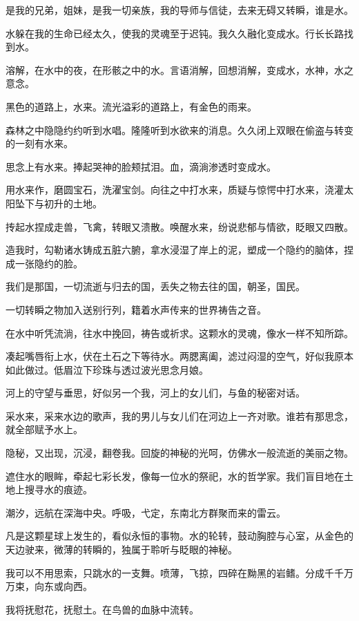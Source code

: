\documentclass[UTF8]{article}
\begin{document}
\par 是我的兄弟，姐妹，是我一切亲族，我的导师与信徒，去来无碍又转瞬，谁是水。
\par 水躲在我的生命已经太久，使我的灵魂至于迟钝。我久久融化变成水。行长长路找到水。
\par 溶解，在水中的夜，在形骸之中的水。言语消解，回想消解，变成水，水神，水之意念。
\\[0.6cm]
\par 黑色的道路上，水来。流光溢彩的道路上，有金色的雨来。
\par 森林之中隐隐约约听到水唱。隆隆听到水欲来的消息。久久闭上双眼在偷盗与转变的一刻有水来。
\par 思念上有水来。捧起哭神的脸颊拭泪。血，滴淌渗透时变成水。
\par 用水来作，磨圆宝石，洗濯宝剑。向往之中打水来，质疑与惊愕中打水来，浇灌太阳坠下与初升的土地。
\par 抟起水捏成走兽，飞禽，转眼又溃散。唤醒水来，纷说悲郁与情欲，眨眼又四散。
\par 造我时，勾勒诸水铸成五脏六腑，拿水浸湿了岸上的泥，塑成一个隐约的脑体，捏成一张隐约的脸。
\par 我们是那国，一切流逝与归去的国，丢失之物去往的国，朝圣，国民。
\par 一切转瞬之物加入送别行列，籍着水声传来的世界祷告之音。
\par 在水中听凭流淌，往水中挽回，祷告或祈求。这颗水的灵魂，像水一样不知所踪。
\par 凑起嘴唇衔上水，伏在土石之下等待水。两腮离阖，滤过闷湿的空气，好似我原本如此做过。低眉泣下珍珠与透过波光思念月娘。
\par 河上的守望与垂思，好似另一个我，河上的女儿们，与鱼的秘密对话。
\par 采水来，采来水边的歌声，我的男儿与女儿们在河边上一齐对歌。谁若有那思念，就全部赋予水上。
\par 隐秘，又出现，沉浸，翻卷我。回旋的神秘的光呵，仿佛水一般流逝的美丽之物。
\par 遮住水的眼眸，牵起七彩长发，像每一位水的祭祀，水的哲学家。我们盲目地在土地上搜寻水的痕迹。
\par 潮汐，远航在深海中央。呼吸，弋定，东南北方群聚而来的雷云。
\par 凡是这颗星球上发生的，看似永恒的事物。水的轮转，鼓动胸腔与心室，从金色的天边驶来，微薄的转瞬的，独属于聆听与眨眼的神秘。
\par 我可以不用思索，只跳水的一支舞。喷薄，飞掠，四碎在黝黑的岩鳍。分成千千万万束，向东或向西。
\par 我将抚慰花，抚慰土。在鸟兽的血脉中流转。
\end{document}
